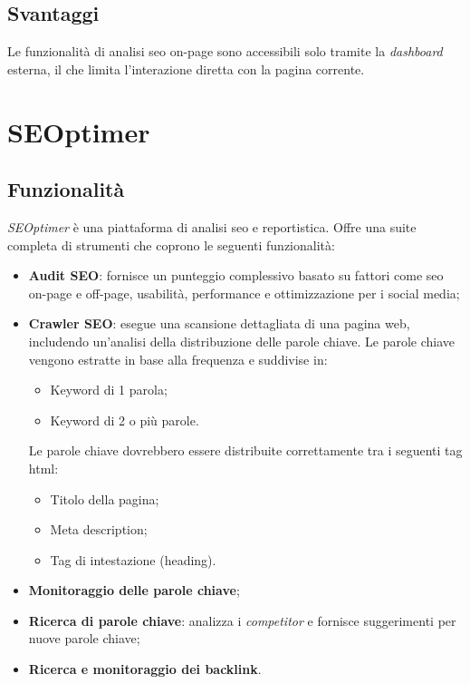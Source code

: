 \subsection{Svantaggi}
\par Le funzionalità di analisi \gls{seo} \gls{on-page} sono accessibili solo tramite la \textit{dashboard} esterna, il che limita l'interazione diretta con la pagina corrente.

\section{SEOptimer}

\subsection{Funzionalità}
\par \textit{SEOptimer} è una piattaforma di analisi \gls{seo} e reportistica. Offre una suite completa di strumenti che coprono le seguenti funzionalità:
\begin{itemize}
    \item \textbf{Audit SEO}: fornisce un punteggio complessivo basato su fattori come \gls{seo} \gls{on-page} e \gls{off-page}, usabilità, performance e ottimizzazione per i social media;
    \item \textbf{Crawler SEO}: esegue una scansione dettagliata di una pagina web, includendo un'analisi della distribuzione delle parole chiave. Le parole chiave vengono estratte in base alla frequenza e suddivise in:
    \begin{itemize}
        \item Keyword di 1 parola;
        \item Keyword di 2 o più parole.
    \end{itemize}
    Le parole chiave dovrebbero essere distribuite correttamente tra i seguenti tag \gls{html}: 
    \begin{itemize}
        \item Titolo della pagina;
        \item Meta description;
        \item Tag di intestazione (heading).
    \end{itemize}
    \item \textbf{Monitoraggio delle parole chiave};
    \item \textbf{Ricerca di parole chiave}: analizza i \textit{competitor} e fornisce suggerimenti per nuove parole chiave;
    \item \textbf{Ricerca e monitoraggio dei \gls{backlink}}.
\end{itemize}

